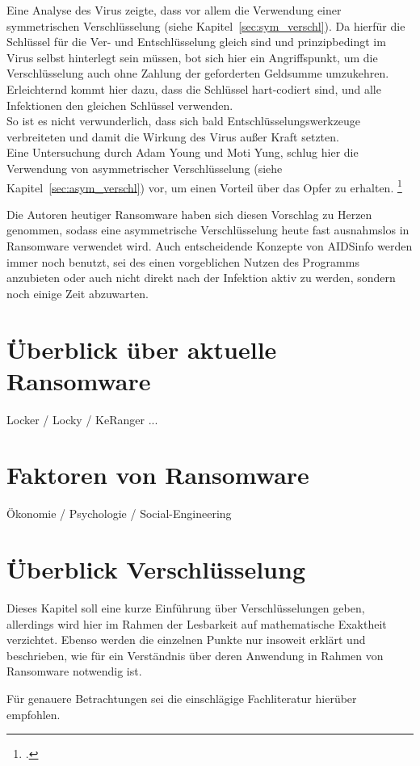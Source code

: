 		Eine Analyse des Virus zeigte, dass vor allem die Verwendung einer symmetrischen Verschlüsselung (siehe Kapitel~\ref{sec:sym_verschl}). 
		Da hierfür die Schlüssel für die Ver- und Entschlüsselung gleich sind und prinzipbedingt im Virus selbst hinterlegt sein müssen, bot sich hier ein Angriffspunkt, um die
		Verschlüsselung auch ohne Zahlung der geforderten Geldsumme umzukehren. Erleichternd kommt hier dazu, dass die Schlüssel hart-codiert sind, und alle Infektionen
		den gleichen Schlüssel verwenden. \\
		So ist es nicht verwunderlich, dass sich bald Entschlüsselungswerkzeuge verbreiteten und damit die Wirkung des Virus außer Kraft setzten. \\
		Eine Untersuchung durch Adam Young und Moti Yung, schlug hier die Verwendung von asymmetrischer Verschlüsselung (siehe Kapitel~\ref{sec:asym_verschl}) vor, um einen
		Vorteil über das Opfer zu erhalten. \footcite{aids:young}
		
		Die Autoren heutiger Ransomware haben sich diesen Vorschlag zu Herzen genommen, sodass eine asymmetrische Verschlüsselung heute fast ausnahmslos in Ransomware 
		verwendet wird. Auch entscheidende Konzepte von AIDSinfo werden immer noch benutzt, sei des einen vorgeblichen Nutzen des Programms anzubieten oder auch nicht 
		direkt nach der Infektion aktiv zu werden, sondern noch einige Zeit abzuwarten. 

\section{Überblick über aktuelle Ransomware}
\label{sec:overview}
Locker / Locky / KeRanger ...

\section{Faktoren von Ransomware} 
	Ökonomie / Psychologie / Social-Engineering
	
\section{Überblick Verschlüsselung}
Dieses Kapitel soll eine kurze Einführung über Verschlüsselungen geben, allerdings wird hier im Rahmen der Lesbarkeit auf mathematische Exaktheit verzichtet. Ebenso werden
die einzelnen Punkte nur insoweit erklärt und beschrieben, wie für ein Verständnis über deren Anwendung in Rahmen von Ransomware notwendig ist. 

Für genauere Betrachtungen sei die einschlägige Fachliteratur hierüber empfohlen. %
